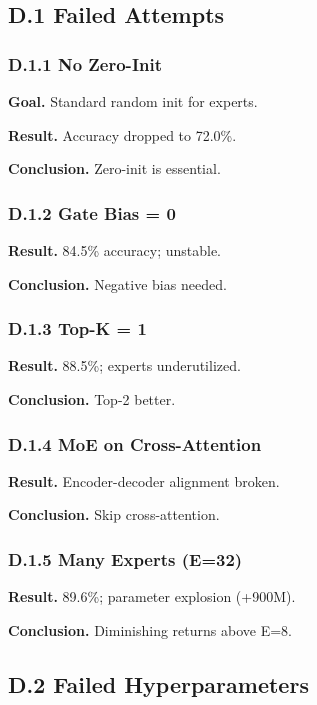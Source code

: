 \subsection{D.1 Failed Attempts}

\subsubsection{D.1.1 No Zero-Init}

\textbf{Goal.} Standard random init for experts.

\textbf{Result.} Accuracy dropped to 72.0\%.

\textbf{Conclusion.} Zero-init is essential.

\subsubsection{D.1.2 Gate Bias = 0}

\textbf{Result.} 84.5\% accuracy; unstable.

\textbf{Conclusion.} Negative bias needed.

\subsubsection{D.1.3 Top-K = 1}

\textbf{Result.} 88.5\%; experts underutilized.

\textbf{Conclusion.} Top-2 better.

\subsubsection{D.1.4 MoE on Cross-Attention}

\textbf{Result.} Encoder-decoder alignment broken.

\textbf{Conclusion.} Skip cross-attention.

\subsubsection{D.1.5 Many Experts (E=32)}

\textbf{Result.} 89.6\%; parameter explosion (+900M).

\textbf{Conclusion.} Diminishing returns above E=8.

\subsection{D.2 Failed Hyperparameters}

